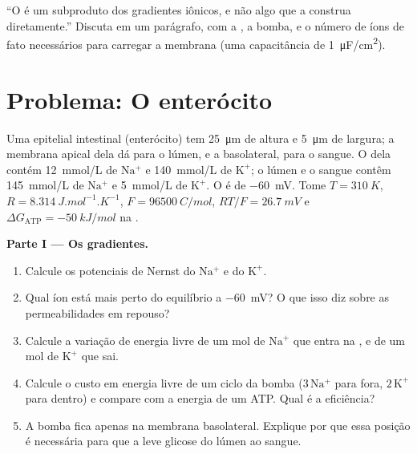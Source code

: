 \begin{exercise}[$\star\star\star$]\label{exo:b1:membranes-transport:12}
``O  é um subproduto dos gradientes iônicos, e não
algo que a  construa diretamente.'' Discuta em um parágrafo, com a
, a bomba, e o número de íons de fato necessários para
carregar a membrana (uma capacitância de \qty{1}{\micro F/cm^2}).
\end{exercise}

\section{Problema: O enterócito}

\begin{problem}
\label{pb:b1:membranes-transport:1}
Uma  epitelial intestinal (enterócito) tem \qty{25}{\micro m} de
altura e \qty{5}{\micro m} de largura; a membrana apical dela dá para o
lúmen, e a basolateral, para o sangue. O  dela contém
\qty{12}{mmol/L} de $\mathrm{Na^+}$ e \qty{140}{mmol/L} de
$\mathrm{K^+}$; o lúmen e o sangue contêm \qty{145}{mmol/L} de
$\mathrm{Na^+}$ e \qty{5}{mmol/L} de $\mathrm{K^+}$. O  é de \qty{-60}{mV}. Tome $T = \qty{310}{K}$,
$R = \qty{8.314}{J.mol^{-1}.K^{-1}}$, $F = \qty{96500}{C/mol}$,
$RT/F = \qty{26.7}{mV}$ e
$\Delta G_{\text{ATP}} = \qty{-50}{kJ/mol}$ na .

\medskip
\noindent\textbf{Parte I --- Os gradientes.}
\begin{enumerate}
  \item Calcule os potenciais de Nernst do $\mathrm{Na^+}$ e do
        $\mathrm{K^+}$.
  \item Qual íon está mais perto do equilíbrio a \qty{-60}{mV}? O que
        isso diz sobre as permeabilidades em repouso?
  \item Calcule a variação de energia livre de um mol de $\mathrm{Na^+}$
        que entra na , e de um mol de $\mathrm{K^+}$ que sai.
  \item Calcule o custo em energia livre de um ciclo da bomba
        ($3\,\mathrm{Na^+}$ para fora, $2\,\mathrm{K^+}$ para dentro) e
        compare com a energia de um ATP. Qual é a eficiência?
  \item A bomba fica apenas na membrana basolateral. Explique por que
        essa posição é necessária para que a  leve glicose do
        lúmen ao sangue.
\end{enumerate}


\end{problem}
